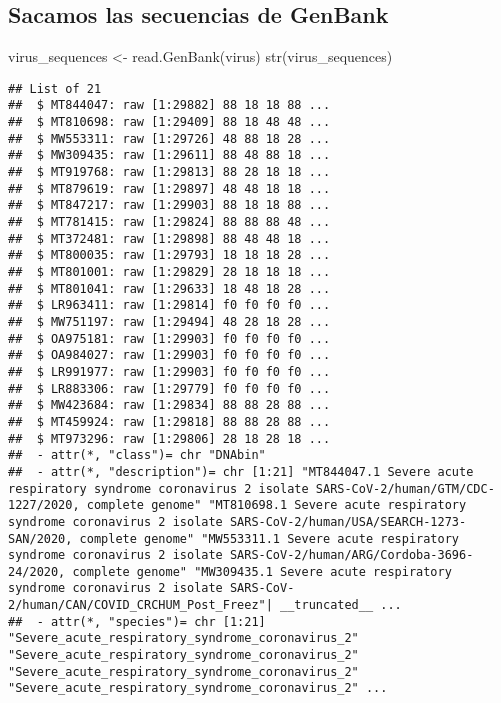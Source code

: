 \documentclass[
]{article}
\newenvironment{Shaded}{\begin{snugshade}}{\end{snugshade}}
\newcommand{\FunctionTok}[1]{\textcolor[rgb]{0.00,0.00,0.00}{#1}}
\newcommand{\NormalTok}[1]{#1}
\newcommand{\OtherTok}[1]{\textcolor[rgb]{0.56,0.35,0.01}{#1}}
\begin{document}
\hypertarget{sacamos-las-secuencias-de-genbank}{%
\subsection{Sacamos las secuencias de
GenBank}\label{sacamos-las-secuencias-de-genbank}}

\begin{Shaded}
\begin{Highlighting}[]
\NormalTok{virus\_sequences }\OtherTok{\textless{}{-}} \FunctionTok{read.GenBank}\NormalTok{(virus)}
\FunctionTok{str}\NormalTok{(virus\_sequences)}
\end{Highlighting}
\end{Shaded}

\begin{verbatim}
## List of 21
##  $ MT844047: raw [1:29882] 88 18 18 88 ...
##  $ MT810698: raw [1:29409] 88 18 48 48 ...
##  $ MW553311: raw [1:29726] 48 88 18 28 ...
##  $ MW309435: raw [1:29611] 88 48 88 18 ...
##  $ MT919768: raw [1:29813] 88 28 18 18 ...
##  $ MT879619: raw [1:29897] 48 48 18 18 ...
##  $ MT847217: raw [1:29903] 88 18 18 88 ...
##  $ MT781415: raw [1:29824] 88 88 88 48 ...
##  $ MT372481: raw [1:29898] 88 48 48 18 ...
##  $ MT800035: raw [1:29793] 18 18 18 28 ...
##  $ MT801001: raw [1:29829] 28 18 18 18 ...
##  $ MT801041: raw [1:29633] 18 48 18 28 ...
##  $ LR963411: raw [1:29814] f0 f0 f0 f0 ...
##  $ MW751197: raw [1:29494] 48 28 18 28 ...
##  $ OA975181: raw [1:29903] f0 f0 f0 f0 ...
##  $ OA984027: raw [1:29903] f0 f0 f0 f0 ...
##  $ LR991977: raw [1:29903] f0 f0 f0 f0 ...
##  $ LR883306: raw [1:29779] f0 f0 f0 f0 ...
##  $ MW423684: raw [1:29834] 88 88 28 88 ...
##  $ MT459924: raw [1:29818] 88 88 28 88 ...
##  $ MT973296: raw [1:29806] 28 18 28 18 ...
##  - attr(*, "class")= chr "DNAbin"
##  - attr(*, "description")= chr [1:21] "MT844047.1 Severe acute respiratory syndrome coronavirus 2 isolate SARS-CoV-2/human/GTM/CDC-1227/2020, complete genome" "MT810698.1 Severe acute respiratory syndrome coronavirus 2 isolate SARS-CoV-2/human/USA/SEARCH-1273-SAN/2020, complete genome" "MW553311.1 Severe acute respiratory syndrome coronavirus 2 isolate SARS-CoV-2/human/ARG/Cordoba-3696-24/2020, complete genome" "MW309435.1 Severe acute respiratory syndrome coronavirus 2 isolate SARS-CoV-2/human/CAN/COVID_CRCHUM_Post_Freez"| __truncated__ ...
##  - attr(*, "species")= chr [1:21] "Severe_acute_respiratory_syndrome_coronavirus_2" "Severe_acute_respiratory_syndrome_coronavirus_2" "Severe_acute_respiratory_syndrome_coronavirus_2" "Severe_acute_respiratory_syndrome_coronavirus_2" ...
\end{verbatim}
\end{document}

